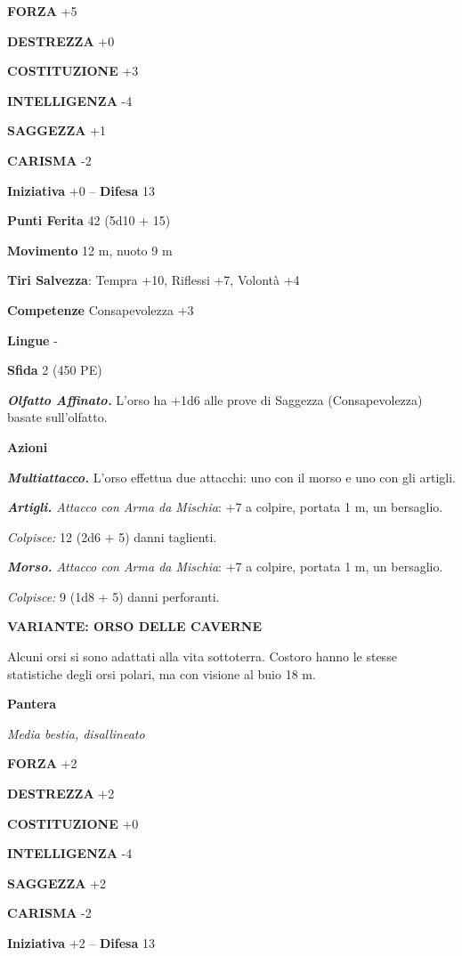 \begin{multicols}{2}
\textbf{FORZA} +5

\textbf{DESTREZZA} +0

\textbf{COSTITUZIONE} +3

\textbf{INTELLIGENZA} -4

\textbf{SAGGEZZA} +1

\textbf{CARISMA} -2

\textbf{Iniziativa} +0 -- \textbf{Difesa} 13

\textbf{Punti Ferita} 42 (5d10 + 15)

\textbf{Movimento} 12 m, nuoto 9 m

\textbf{Tiri Salvezza}: Tempra +10, Riflessi +7, Volontà +4 

\textbf{Competenze} Consapevolezza +3

\textbf{Lingue} -

\textbf{Sfida} 2 (450 PE)

\emph{\textbf{Olfatto Affinato.}} L'orso ha +1d6 alle prove di Saggezza (Consapevolezza) basate sull'olfatto.

\textbf{Azioni}

\emph{\textbf{Multiattacco.}} L'orso effettua due attacchi: uno con il morso e uno con gli artigli.

\emph{\textbf{Artigli.} Attacco con Arma da Mischia}: +7 a colpire, portata 1 m, un bersaglio.

\emph{Colpisce:} 12 (2d6 + 5) danni taglienti.

\emph{\textbf{Morso.} Attacco con Arma da Mischia}: +7 a colpire, portata 1 m, un bersaglio.

\emph{Colpisce:} 9 (1d8 + 5) danni perforanti.

\textbf{VARIANTE: ORSO DELLE CAVERNE}

Alcuni orsi si sono adattati alla vita sottoterra. Costoro hanno le stesse statistiche degli orsi polari, ma con visione al buio 18 m.

\medskip\textbf{Pantera}

\emph{Media bestia, disallineato}

\textbf{FORZA} +2

\textbf{DESTREZZA} +2

\textbf{COSTITUZIONE} +0

\textbf{INTELLIGENZA} -4

\textbf{SAGGEZZA} +2

\textbf{CARISMA} -2

\textbf{Iniziativa} +2 -- \textbf{Difesa} 13


\end{multicols}
